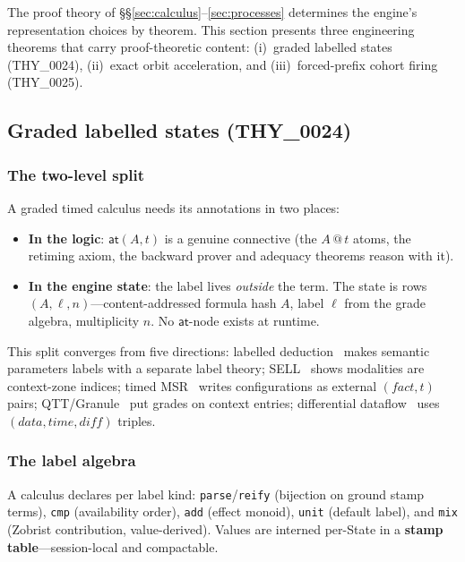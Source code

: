 \documentclass[11pt]{article}
\makeatletter
\newcommand{\stmp}[2]{#1\mathbin{@}#2}           %
\theoremstyle{definition}
\theoremstyle{remark}
\makeatother
\begin{document}
The proof theory of \S\S\ref{sec:calculus}--\ref{sec:processes} determines the
engine's representation choices by theorem.  This section presents three
engineering theorems that carry proof-theoretic content:
(i)~graded labelled states (THY\_0024), (ii)~exact orbit acceleration, and
(iii)~forced-prefix cohort firing (THY\_0025).

\subsection{Graded labelled states (THY\_0024)}
\label{subsec:labelled}

\subsubsection*{The two-level split}

A graded timed calculus needs its annotations in two places:

\begin{itemize}
\item \textbf{In the logic}: $\mathsf{at}(A, t)$ is a genuine connective (the
  $\stmp{A}{t}$ atoms, the retiming axiom, the backward prover and adequacy
  theorems reason with it).
\item \textbf{In the engine state}: the label lives \emph{outside} the term.  The
  state is rows $(A, \ell, n)$---content-addressed formula hash $A$, label $\ell$
  from the grade algebra, multiplicity $n$.  No $\mathsf{at}$-node exists at
  runtime.
\end{itemize}

This split converges from five directions: labelled
deduction~\cite{Gabbay1996,Negri2005} makes semantic parameters labels with a
separate label theory; SELL~\cite{NigamOlartePimentel2017} shows modalities are
context-zone indices; timed MSR~\cite{KanovichFORMATS2016} writes configurations
as external $(\mathit{fact}, t)$ pairs; QTT/Granule~\cite{Atkey2018,OrchardLiepeltEades2019}
put grades on context entries; differential
dataflow~\cite{MurrayMcSherry2013} uses $(\mathit{data}, \mathit{time},
\mathit{diff})$ triples.

\subsubsection*{The label algebra}

A calculus declares per label kind: \texttt{parse}/\texttt{reify}
(bijection on ground stamp terms), \texttt{cmp} (availability order),
\texttt{add} (effect monoid), \texttt{unit} (default label), and \texttt{mix}
(Zobrist contribution, value-derived).  Values are interned per-State in a
\textbf{stamp table}---session-local and compactable.
\end{document}
